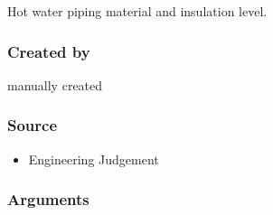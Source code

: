 Hot water piping material and insulation level.

\subsubsection{Created by}\label{created-by-92}

manually created

\subsubsection{Source}\label{source-91}

\begin{itemize}
 
\item
  Engineering Judgement
\end{itemize}

\subsubsection{Arguments}\label{arguments-59}

